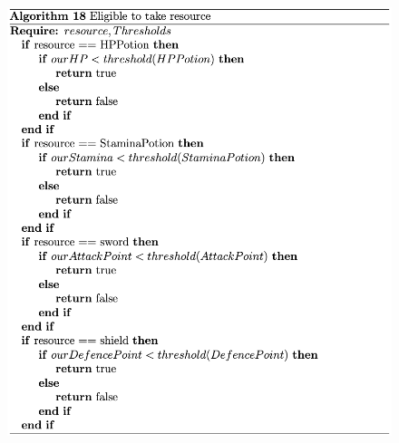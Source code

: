 

\begin{figure}[htb]
    \centering
    \includegraphics[scale=0.7]{006_team_3_agent_design/FIGS/Algo18.png}
    \label{fig:algo18}
\end{figure}

